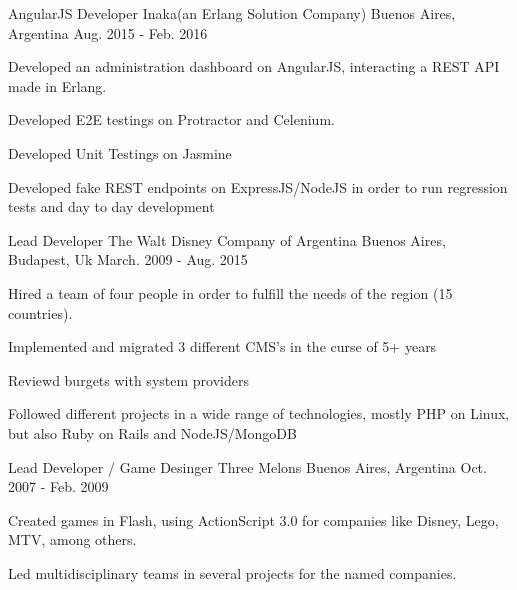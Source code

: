 \begin{cventries}
  \cventry
    {AngularJS Developer} %
    {Inaka(an Erlang Solution Company)} %
    {Buenos Aires, Argentina} %
    {Aug. 2015 - Feb. 2016} %
    {
      \begin{cvitems} %
       \item {Developed an administration dashboard on AngularJS, interacting a REST API made in Erlang.}
       \item {Developed E2E testings on Protractor and Celenium.}
       \item {Developed Unit Testings on Jasmine}
       \item {Developed fake REST endpoints on ExpressJS/NodeJS in order to run regression tests and day to day development}
      \end{cvitems}
    }
  \cventry
    {Lead Developer} %
    {The Walt Disney Company of Argentina} %
    {Buenos Aires, Budapest, Uk} %
    {March. 2009 - Aug. 2015} %
    {
      \begin{cvitems} %
        \item {Hired a team of four people in order to fulfill the needs of the region (15 countries).}
        \item {Implemented and migrated 3 different CMS's in the curse of 5+ years}
        \item {Reviewd burgets with system providers}
        \item {Followed different projects in a wide range of technologies, mostly PHP on Linux, but also Ruby on Rails and NodeJS/MongoDB}
      \end{cvitems}
    }

  \cventry
    {Lead Developer / Game Desinger} %
    {Three Melons} %
    {Buenos Aires, Argentina} %
    {Oct. 2007 - Feb. 2009} %
    {
      \begin{cvitems} %
        \item {Created games in Flash, using ActionScript 3.0 for companies like Disney, Lego, MTV, among others.}
        \item {Led multidisciplinary teams in several projects for the named companies.}
      \end{cvitems}
    }


\end{cventries}
